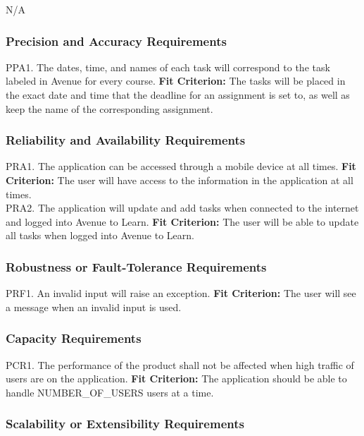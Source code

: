 \documentclass[12pt, titlepage]{article}
\begin{document}
N/A

\subsubsection{Precision and Accuracy Requirements}

PPA1. The dates, time, and names of each task will correspond to the task labeled in Avenue for every course.
	\textbf{Fit Criterion:} The tasks will be placed in the exact date and time that the deadline for an 
assignment is set to, as well as keep the name of the corresponding assignment.

\subsubsection{Reliability and Availability Requirements}

PRA1. The application can be accessed through a mobile device at all times.
	\textbf{Fit Criterion:} The user will have access to the information in the application at all times.\\

\noindent PRA2. The application will update and add tasks when connected to the internet and logged into Avenue to Learn.
	\textbf{Fit Criterion:} The user will be able to update all tasks when logged into Avenue to 
Learn.

\subsubsection{Robustness or Fault-Tolerance Requirements}

PRF1. An invalid input will raise an exception.
	\textbf{Fit Criterion:} The user will see a message when an invalid input is used.

\subsubsection{Capacity Requirements}

PCR1. The performance of the product shall not be affected when high traffic of users are on the application.
	\textbf{Fit Criterion:} The application should be able to handle NUMBER\_OF\_USERS users at 
a time.

\subsubsection{Scalability or Extensibility Requirements}
\end{document}
